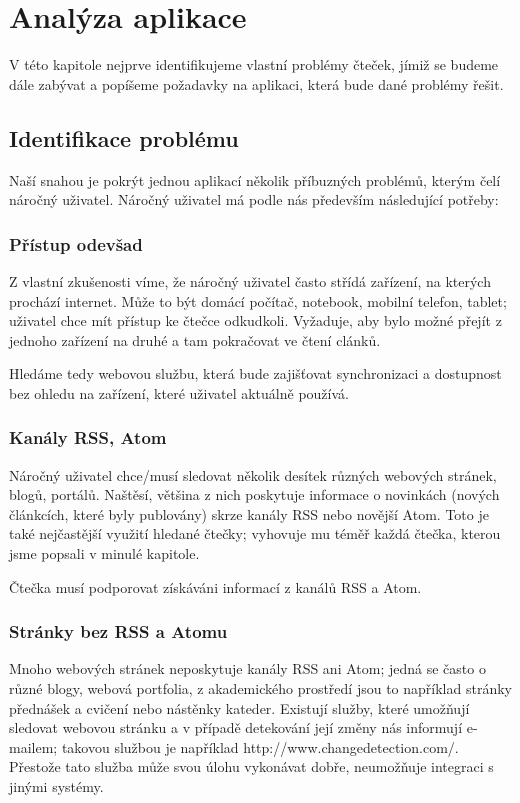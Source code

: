 \chapter{Analýza aplikace}

V této kapitole nejprve identifikujeme vlastní problémy čteček, jímiž se budeme dále zabývat a popíšeme požadavky na aplikaci, která bude dané problémy řešit.

\section{Identifikace problému}

Naší snahou je pokrýt jednou aplikací několik příbuzných problémů, kterým čelí náročný uživatel.
Náročný uživatel má podle nás především následující potřeby:

\subsection{Přístup odevšad}
Z vlastní zkušenosti víme, že náročný uživatel často střídá zařízení, na kterých prochází internet.
Může to být domácí počítač, notebook, mobilní telefon, tablet; uživatel chce mít přístup ke čtečce odkudkoli.
Vyžaduje, aby bylo možné přejít z jednoho zařízení na druhé a tam pokračovat ve čtení clánků.

Hledáme tedy webovou službu, která bude zajišťovat synchronizaci a dostupnost bez ohledu na zařízení, které uživatel aktuálně používá.

\subsection{Kanály RSS, Atom}
Náročný uživatel chce/musí sledovat několik desítek různých webových stránek, blogů, portálů.
Naštěsí, většina z nich poskytuje informace o novinkách (nových článkcích, které byly publovány) skrze kanály RSS nebo novější Atom.
Toto je také nejčastější využití hledané čtečky; vyhovuje mu téměř každá čtečka, kterou jsme popsali v minulé kapitole. %

Čtečka musí podporovat získáváni informací z kanálů RSS a Atom.

\subsection{Stránky bez RSS a Atomu}
Mnoho webových stránek neposkytuje kanály RSS ani Atom; jedná se často o různé blogy, webová portfolia, z akademického prostředí jsou to například stránky přednášek a cvičení nebo nástěnky kateder.
Existují služby, které umožňují sledovat webovou stránku a v případě detekování její změny nás informují e-mailem; takovou službou je například http://www.changedetection.com/.
Přestože tato služba může svou úlohu vykonávat dobře, neumožňuje integraci s jinými systémy.

